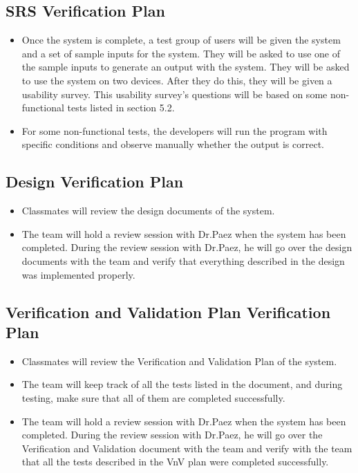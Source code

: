 \documentclass[12pt, titlepage]{article}
\begin{document}
\subsection{SRS Verification Plan}
\label{section:4.2}
\begin{itemize}
    \item Once the system is complete, a test group of users will be given the system and a set of sample inputs for the system. They will be asked to use one of the sample inputs to generate an output with the system. They will be asked to use the system on two devices. After they do this, they will be given a usability survey. This usability survey's questions will be based on some non-functional tests listed in section 5.2.
    \item For some non-functional tests, the developers will run the program with specific conditions and observe manually whether the output is correct.
\end{itemize}


\subsection{Design Verification Plan}
\label{section:4.3}

\begin{itemize}
    \item Classmates will review the design documents of the system.
    \item The team will hold a review session with Dr.Paez when the system has been completed. During the review session with Dr.Paez, he will go over the design documents with the team and verify that everything described in the design was implemented properly.
\end{itemize}

\subsection{Verification and Validation Plan Verification Plan}
\label{section:4.4}

\begin{itemize}
    \item Classmates will review the Verification and Validation Plan of the system.
    \item The team will keep track of all the tests listed in the document, and during testing, make sure that all of them are completed successfully.
    \item The team will hold a review session with Dr.Paez when the system has been completed. During the review session with Dr.Paez, he will go over the Verification and Validation document with the team and verify with the team that all the tests described in the VnV plan were completed successfully.
\end{itemize}
\end{document}
